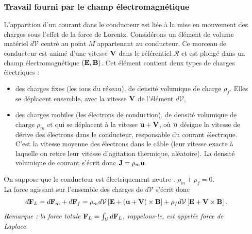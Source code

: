 \documentclass[11pt,a4paper]{report}
\begin{document}
\subsubsection{Travail fourni par le champ électromagnétique}

L'apparition d'un courant dans le conducteur est liée à la mise en mouvement des charges sous l'effet de la force de Lorentz. Considérons un élément de volume matériel $d\mathcal{V}$ centré au point $M$ appartenant au conducteur. Ce morceau de conducteur est animé d'une vitesse $\bold{V}$ dans le référentiel $\mathcal{R}$ et est plongé dans un champ électromagnétique $(\bold{E},\bold{B})$. Cet élément contient deux types de charges électriques :
\begin{itemize}
	\item des charges fixes (les ions du réseau), de densité volumique de charge $\rho_f$. Elles se déplacent ensemble, avec la vitesse $\bold{V}$ de l'élément $d\mathcal{V}$,
	\item des charges mobiles (les électrons de conduction), de densité volumique de charge $\rho_m$ et qui se déplacent à la vitesse $\bold{u}+\bold{V}$, où $\bold{u}$ désigne la vitesse de dérive des électrons dans le conducteur, responsable du courant électrique. C'est la vitesse moyenne des électrons dans le câble (leur vitesse exacte à laquelle on retire leur vitesse d'agitation thermique, aléatoire). La densité volumique de courant s'écrit donc $\bold{J} = \rho_m \bold{u}$.
\end{itemize}
On suppose que le conducteur est électriquement neutre : $\rho_m + \rho_f = 0$.\\


La force agissant sur l'ensemble des charges de $d\mathcal{V}$ s'écrit donc
\begin{equation}
	d\bold{F}_L = d\bold{F}_m + d\bold{F}_f = \rho_m d\mathcal{V} \left[\bold{E}+\left(\bold{u}+\bold{V}\right)\times\bold{B}\right]   
	+ \rho_f d\mathcal{V} \left[\bold{E}+\bold{V}\times\bold{B}\right].
\end{equation}
\textit{Remarque : la force totale $\bold{F}_L = \int_\mathcal{V} d\bold{F}_L$, rappelons-le, est appelée force de Laplace.}\\
\end{document}
